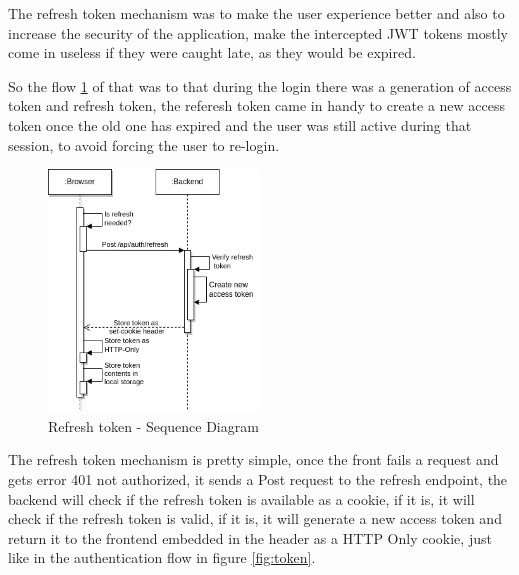 The refresh token mechanism was to make the user experience better and also to increase
the security of the application, make the intercepted JWT tokens mostly come in useless
if they were caught late, as they would be expired.

So the flow \ref{fig:refresh} of that was to that during the login there was a generation
of access token and refresh token, the referesh token came in handy to create a new access
token once the old one has expired and the user was still active during that session, to
avoid forcing the user to re-login.

\begin{figure}[!ht]
    \centering
    \includegraphics[width=0.5\textwidth]{images/refresh.png}
    \caption{\footnotesize{Refresh token - Sequence Diagram}}
    \label{fig:refresh}
\end{figure}

The refresh token mechanism is pretty simple, once the front fails a request and gets
error 401 not authorized, it sends a Post request to the refresh endpoint,
the backend will check if the refresh token is available as a cookie, if it is, it will
check if the refresh token is valid, if it is, it will generate a new access token and
return it to the frontend embedded in the header as a HTTP Only cookie, just like in
the authentication flow in figure \ref{fig:token}.
